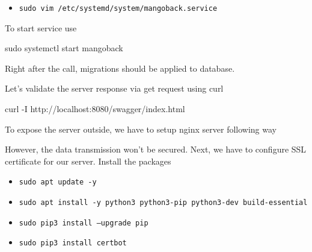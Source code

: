 \begin{itemize}
    \item \texttt{sudo vim /etc/systemd/system/mangoback.service}
\end{itemize}

To start service use

\begin{center}
    \begin{spverbatim}
        sudo systemctl start mangoback
    \end{spverbatim}
\end{center}

Right after the call, migrations should be applied to database.

Let's validate the server response via get request using curl

\begin{center}
    \begin{spverbatim}
        curl -I http://localhost:8080/swagger/index.html
    \end{spverbatim}
\end{center}

To expose the server outside, we have to setup nginx server following way

\begin{center}
\end{center}

However, the data transmission won't be secured.
Next, we have to configure SSL certificate for our server.
Install the packages
\begin{itemize}
    \item \texttt{sudo apt update -y}
    \item \texttt{sudo apt install -y python3 python3-pip python3-dev build-essential}
    \item \texttt{sudo pip3 install --upgrade pip}
    \item \texttt{sudo pip3 install certbot}
\end{itemize}
